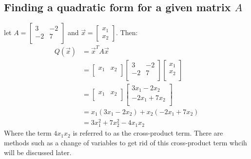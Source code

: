 \documentclass[11pt, a4paper]{article}
\begin{document}
\subsection{Finding a quadratic form for a given matrix $A$}
let $A = \begin{bmatrix} 3 & -2\\ -2 & 7\\ \end{bmatrix}$ and $\vec{x} = \begin{bmatrix} x_1 \\ x_2 \end{bmatrix}$. Then:
\begin{align*}
  Q(\vec{x}) &= \vec{x}^T A \vec{x}\\
  &= \begin{bmatrix} x_1 & x_2\\ \end{bmatrix} \begin{bmatrix} 3 & -2\\ -2 & 7\\ \end{bmatrix} \begin{bmatrix} x_1 \\ x_2 \\ \end{bmatrix}\\
  &= \begin{bmatrix} x_1 & x_2 \\ \end{bmatrix} \begin{bmatrix} 3x_1-2x_2\\ -2x_1 + 7x_2 \\ \end{bmatrix}\\
  &= x_1(3x_1-2x_2) + x_2(-2x_1 + 7x_2)\\
  &= 3x_1^2 + 7x_2^2 - 4x_1x_2
\end{align*}
Where the term $4x_1x_2$ is referred to as the cross-product term. There are methods such as a change of variables to get rid of this cross-product term whcih will be discussed later.
\end{document}
